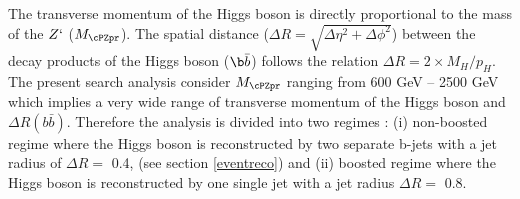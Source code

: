 
\par The  transverse momentum of the Higgs boson is directly proportional to the mass of the $Z`$ ($M_{\cPZpr}$). 
The spatial distance ($\Delta R = \sqrt{ \Delta\eta^2 + \Delta \phi^2  }$) 
between the decay products of the Higgs boson ($\b\bar{b}$) follows the relation $\Delta R = 2 \times M_{H}/p_{H}$. 
The present search analysis consider $M_{\cPZpr}$ ranging from 
600 GeV -- 2500 GeV which implies a very wide range of transverse momentum of the Higgs boson and $\Delta R(b\bar{b})$. 
Therefore the analysis is divided into two regimes : (i) non-boosted regime where the Higgs boson is reconstructed by two separate b-jets with a jet radius of $\Delta R =$ 0.4, (see section \ref{eventreco})
and (ii) boosted regime where the Higgs boson is reconstructed by one single jet with a jet radius $\Delta R =$ 0.8. 

%
%
%
%
%
%



